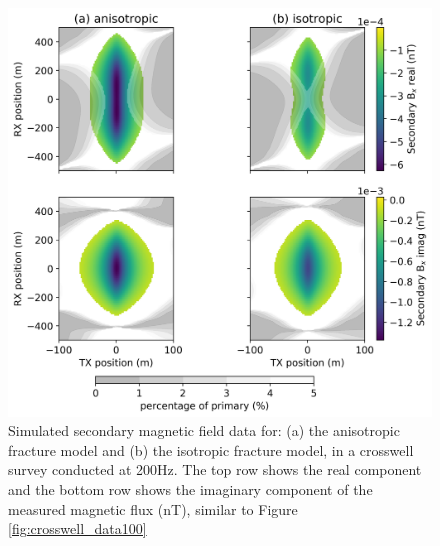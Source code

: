 \begin{figure}
    \begin{center}
    \includegraphics[width=\textwidth]{figures/phys_prop_model/crosswell_data200.png}
    \end{center}
\caption{
    Simulated secondary magnetic field data for: (a) the anisotropic fracture model and
    (b) the isotropic fracture model, in a crosswell survey conducted at 200Hz.
    The top row shows the real component and the bottom row shows
    the imaginary component of the measured magnetic flux (nT), similar to Figure \ref{fig:crosswell_data100}
}
\label{fig:crosswell_data200}
\end{figure}
